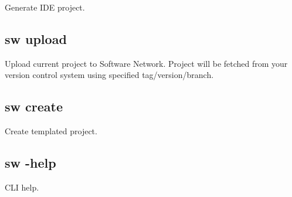Generate IDE project.

\subsection{sw upload}

Upload current project to Software Network.
Project will be fetched from your version control system using specified tag/version/branch.

\subsection{sw create}

Create templated project.

\subsection{sw -help}

CLI help.

